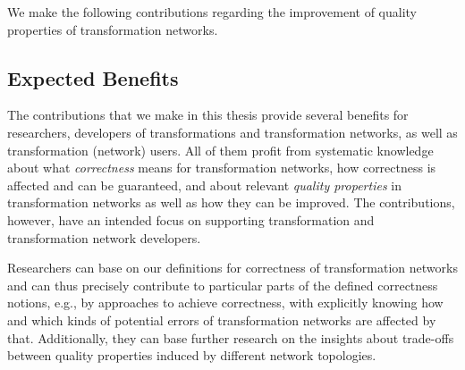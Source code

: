 We make the following contributions regarding the improvement of quality properties of transformation networks.
\begin{contributions}
    \begin{integrationcontribution}
    \end{integrationcontribution}
\end{contributions}


\subsection{Expected Benefits}

The contributions that we make in this thesis provide several benefits for researchers, developers of transformations and transformation networks, as well as transformation (network) users.
All of them profit from systematic knowledge about what \emph{correctness} means for transformation networks, how correctness is affected and can be guaranteed, and about relevant \emph{quality properties} in transformation networks as well as how they can be improved.
The contributions, however, have an intended focus on supporting transformation and transformation network developers. 

Researchers can base on our definitions for correctness of transformation networks and can thus precisely contribute to particular parts of the defined correctness notions, e.g., by approaches to achieve correctness, with explicitly knowing how and which kinds of potential errors of transformation networks are affected by that.
Additionally, they can base further research on the insights about trade-offs between quality properties induced by different network topologies.

